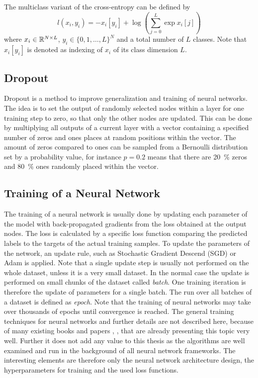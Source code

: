 The multiclass variant of the cross-entropy can be defined by
\begin{equation}
  l(x_i, y_i) = - x_i[y_i] + \log{\left( \sum_{j=0}^{L} \exp{x_i[j]} \right)}
\end{equation}
where $x_i \in \mathbb{R}^{N \times L}$, $y_i \in \{0, 1, \dots, L\}^N$ and a total number of $L$ classes.
Note that $x_i[y_i]$ is denoted as indexing of $x_i$ of its class dimension $L$. 



\subsection{Dropout}
Dropout \cite{Hinton2012} is a method to improve generalization and training of neural networks.
The idea is to set the output of randomly selected nodes within a layer for one training step to zero, so that only the other nodes are updated.
This can be done by multiplying all outputs of a current layer with a vector containing a specified number of zeros and ones places at random positions within the vector.
The amount of zeros compared to ones can be sampled from a Bernoulli distribution set by a probability value, for instance $p=0.2$ means that there are \SI{20}{\percent} zeros and \SI{80}{\percent} ones randomly placed within the vector.



\subsection{Training of a Neural Network}
The training of a neural network is usually done by updating each parameter of the model with back-propagated gradients from the loss obtained at the output nodes.
The loss is calculated by a specific loss function comparing the predicted labels to the targets of the actual training samples.
To update the parameters of the network, an update rule, such as Stochastic Gradient Descend (SGD) or Adam \cite{Kingma2015} is applied.
Note that a single update step is usually not performed on the whole dataset, unless it is a very small dataset. 
In the normal case the update is performed on small chunks of the dataset called \emph{batch}.
One training iteration is therefore the update of parameters for a single batch.
The run over all batches of a dataset is defined as \emph{epoch}.
Note that the training of neural networks may take over thousands of epochs until convergence is reached.
The general training techniques for neural networks and further details are not described here, because of many existing books and papers \cite{LeCun2006}, \cite{Goodfellow2016}, \cite{DeepLearning} that are already presenting this topic very well. 
Further it does not add any value to this thesis as the algorithms are well examined and run in the background of all neural network frameworks.
The interesting elements are therefore only the neural network architecture design, the hyperparameters for training and the used loss functions.


